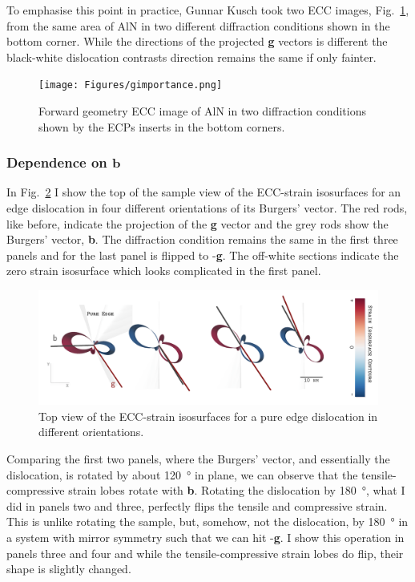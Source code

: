 To emphasise this point in practice, Gunnar Kusch took two ECC images, Fig.~\ref{fig:gimportance},  from the same area of AlN in two different diffraction conditions shown in the bottom corner.   While the directions of the projected \textbf{g} vectors is different the black-white dislocation contrasts direction remains the same if only fainter. 

\begin{figure}[ht]
    \centering
    \texttt{[image: Figures/gimportance.png]}
    \caption{Forward geometry ECC image of AlN in two diffraction conditions shown by the ECPs inserts in the bottom corners.}
    \label{fig:gimportance}
\end{figure}
\subsubsection{Dependence on \texorpdfstring{$\mathbf{b}$}{b}}

In Fig.~\ref{fig:bdependence} I show the top of the sample view of the ECC-strain isosurfaces for an edge dislocation in four different orientations of its Burgers' vector.  The red rods, like before, indicate the projection of the \textbf{g} vector and the grey rods show the Burgers' vector, \textbf{b}. The diffraction condition remains the same in the first three panels and for the last panel is flipped to -\textbf{g}. The off-white sections indicate the zero strain isosurface which looks complicated in the first panel.


\begin{figure}[ht]
    \centering
    \includegraphics[width=1.05\linewidth]{Figures/bdependence.png}
    \caption{Top view of the ECC-strain isosurfaces for a pure edge dislocation in different orientations.  }
    \label{fig:bdependence}
\end{figure}

Comparing the first two panels, where the Burgers' vector, and essentially the dislocation, is rotated by about \SI{120}{\degree} in plane, we can observe that the tensile-compressive strain lobes rotate with \textbf{b}. Rotating the dislocation by \SI{180}{\degree}, what I did in panels two and three, perfectly flips the tensile and compressive strain. This is unlike rotating the sample, but, somehow, not the dislocation, by \SI{180}{\degree} in a system with mirror symmetry such that we can hit -\textbf{g}. I show this operation in panels three and four and while the  tensile-compressive strain lobes do flip, their shape is slightly changed. 

